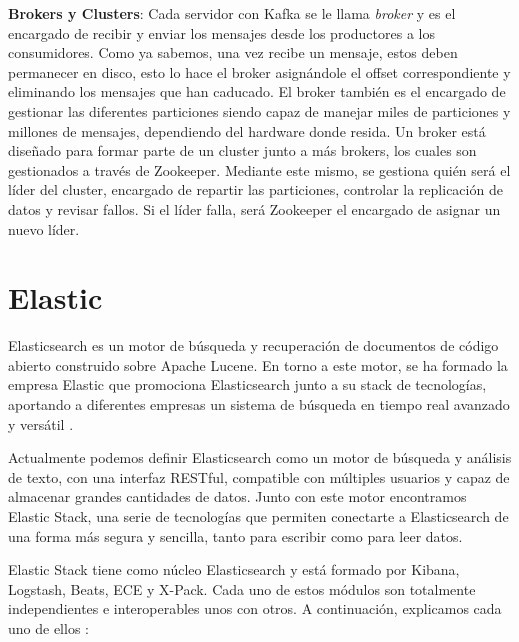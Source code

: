 \textbf{Brokers y Clusters}: Cada servidor con Kafka se le llama {\em
  broker} y es el encargado de recibir y enviar los mensajes desde los
productores a los consumidores. Como ya sabemos, una vez recibe un mensaje,
estos deben permanecer en disco, esto lo hace el broker asignándole el
offset correspondiente y eliminando los mensajes que han caducado. El
broker también es el encargado de gestionar las diferentes particiones
siendo capaz de manejar miles de particiones y millones de mensajes,
dependiendo del hardware donde resida. Un broker está diseñado para formar
parte de un cluster junto a más brokers, los cuales son gestionados a
través de Zookeeper. Mediante este mismo, se gestiona quién será el líder
del cluster, encargado de repartir las particiones, controlar la
replicación de datos y revisar fallos. Si el líder falla, será Zookeeper el
encargado de asignar un nuevo líder.


\section{Elastic\label{Elastic}}

Elasticsearch es un motor de búsqueda y recuperación de documentos de
código abierto construido sobre Apache Lucene. En torno a este motor, se ha
formado la empresa Elastic que promociona Elasticsearch junto a su stack de
tecnologías, aportando a diferentes empresas un sistema de búsqueda en
tiempo real avanzado y versátil \cite{Elk-1}.

Actualmente podemos definir Elasticsearch como un motor de búsqueda y
análisis de texto, con una interfaz RESTful, compatible con múltiples
usuarios y capaz de almacenar grandes cantidades de datos. Junto con este
motor encontramos Elastic Stack, una serie de tecnologías que permiten
conectarte a Elasticsearch de una forma más segura y sencilla, tanto para
escribir como para leer datos.

Elastic Stack tiene como núcleo Elasticsearch y está formado por Kibana,
Logstash, Beats, ECE y X-Pack. Cada uno de estos módulos son totalmente
independientes e interoperables unos con otros. A continuación, explicamos
cada uno de ellos \cite{Elk-4}:

